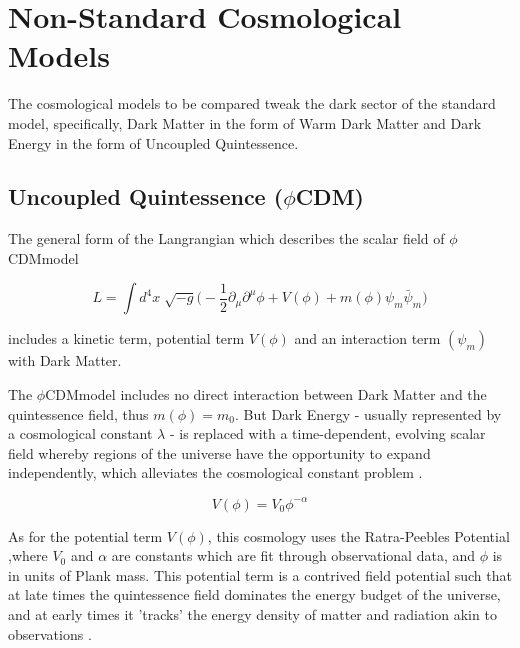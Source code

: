 \documentclass[a4paper,fleqn,usenatbib]{mnras}
\def \qcdm{$\phi$CDM}
\begin{document}
\section{Non-Standard Cosmological Models}\label{cosmos}
The cosmological models to be compared tweak the dark sector of the standard model, specifically, Dark Matter in the form of Warm Dark Matter and Dark Energy in the form of Uncoupled Quintessence. 

\subsection{Uncoupled Quintessence  (\qcdm)}
The general form of the Langrangian which describes the scalar field of \qcdm model
\begin{ceqn}
\begin{equation}
L=\int d^{4}x\sqrt[]{-g}\big(-\frac{1}{2}\partial_{\mu}\partial^{\mu}\phi+V(\phi)+m(\phi)\psi_{m}\bar{\psi}_{m}\big)
\end{equation}
\end{ceqn}
includes a kinetic term, potential term $V(\phi)$ and an interaction term $(\psi_{m})$ with Dark Matter.

The \qcdm model includes no direct interaction between Dark Matter and the quintessence field, thus $m(\phi)=m_{0}$. But Dark Energy - usually represented by a cosmological constant $\lambda$ - is replaced with a time-dependent, evolving scalar field whereby regions of the universe have the opportunity to expand independently, which alleviates the cosmological constant problem \citep{Joyce_15}.
\begin{ceqn}
\begin{equation}
V(\phi)=V_{0}\phi^{-\alpha}\label{rp}
\end{equation}
\end{ceqn}
As for the potential term $V(\phi)$, this cosmology uses the Ratra-Peebles Potential  \citep{Ratra_88},where $V_{0}$ and $\alpha$ are constants which are fit through observational data, and $\phi$ is in units of Plank mass. This potential term is a contrived field potential such that at late times the quintessence field dominates the energy budget of the universe, and at early times it 'tracks' the energy density of matter and radiation akin to observations \citep{Joyce_15}.
\end{document}
